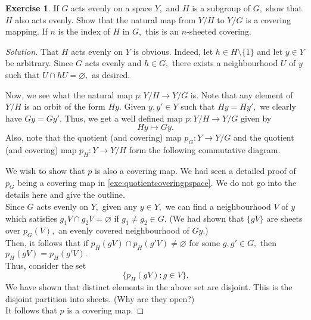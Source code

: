 \documentclass[12pt]{article}
\theoremstyle{definition}
\numberwithin{thm}{section}
\newtheorem{exe}[thm]{Exercise}
\let\emptyset\varnothing
\newenvironment{soln}{\begin{proof}[Solution]}{\end{proof}}
\begin{document}
\begin{exe}
	If $G$ acts evenly on a space $Y,$ and $H$ is a subgroup of $G,$ show that $H$ also acts evenly. Show that the natural map from $Y/H$ to $Y/G$ is a covering mapping. If $n$ is the index of $H$ in $G,$ this is an $n$-sheeted covering. 
\end{exe}
\begin{soln}
	That $H$ acts evenly on $Y$ is obvious. Indeed, let $h \in H\setminus\{1\}$ and let $y \in Y$ be arbitrary. Since $G$ acts evenly and $h \in G,$ there exists a neighbourhood $U$ of $y$ such that $U \cap hU = \emptyset,$ as desired. \par

	Now, we see what the natural map $p:Y/H \to Y/G$ is. Note that any element of $Y/H$ is an orbit of the form $Hy.$ Given $y, y' \in Y$ such that $Hy = Hy',$ we clearly have $Gy = Gy'.$ Thus, we get a well defined map $p:Y/H \to Y/G$ given by
	\begin{equation*} 
		Hy \mapsto Gy.
	\end{equation*}
	Also, note that the quotient (and covering) map $p_G:Y \to Y/G$ and the quotient (and covering) map $p_H: Y \to Y/H$ form the following commutative diagram.
	\begin{center}
	\end{center}
	We wish to show that $p$ is also a covering map. We had seen a detailed proof of $p_G$ being a covering map in \cref{exe:quotientcoveringpspace}. We do not go into the details here and give the outline.\\
	Since $G$ acts evenly on $Y,$ given any $y \in Y,$ we can find a neighbourhood $V$ of $y$ which satisfies $g_1V \cap g_2V = \emptyset$ if $g_1 \neq g_2 \in G.$ (We had shown that $\{gV\}$ are sheets over $p_G(V),$ an evenly covered neighbourhood of $Gy.$)  \\
	Then, it follows that if $p_H(gV) \cap p_H(g'V) \neq \emptyset$ for some $g, g' \in G,$ then $p_H(gV) = p_H(g'V).$\\
	Thus, consider the set
	\begin{equation*} 
		\{p_H(gV) : g \in V\}.
	\end{equation*}
	We have shown that distinct elements in the above set are disjoint. This is the disjoint partition into sheets. (Why are they open?)\\
	It follows that $p$ is a covering map.


\end{soln}
\end{document}
